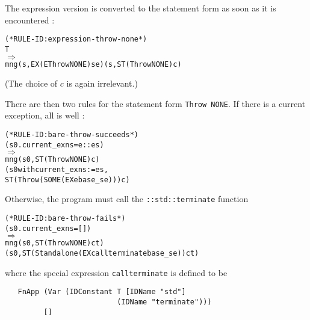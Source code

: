 \documentclass[11pt]{article}
\begin{document}
The expression version \ethrow{} is converted to the statement form as
soon as it is encountered :
\begin{center}
\begin{minipage}{\textwidth}
%
\begin{alltt}
(* RULE-ID: expression-throw-none *)
     T
   \(\Rightarrow\)
     mng (s, EX (EThrow NONE) se) (s, ST (Throw NONE) c)
\end{alltt}
\end{minipage}
\end{center}
(The choice of $c$ is again irrelevant.)

There are then two rules for the statement form \texttt{Throw~NONE}.
If there is a current exception, all is well
:
\begin{center}
  \begin{minipage}{\textwidth}
%
%
\begin{alltt}
(* RULE-ID: bare-throw-succeeds *)
     (s0.current_exns = e::es)
   \(\Rightarrow\)
     mng (s0, ST (Throw NONE) c)
         (s0 with current_exns := es,
          ST (Throw (SOME (EX e base_se))) c)
\end{alltt}
\end{minipage}
\end{center}
Otherwise, the program must call the \texttt{::std::terminate} function
\begin{center}
\begin{minipage}{\textwidth}
%
\begin{alltt}
(* RULE-ID: bare-throw-fails *)
     (s0.current_exns = [])
   \(\Rightarrow\)
     mng (s0, ST (Throw NONE) ct)
         (s0, ST (Standalone (EX callterminate base_se)) ct)
\end{alltt}
\end{minipage}
\end{center}
where the special expression \texttt{callterminate} is defined to be
\begin{verbatim}
   FnApp (Var (IDConstant T [IDName "std"]
                          (IDName "terminate")))
         []
\end{verbatim}
\end{document}
